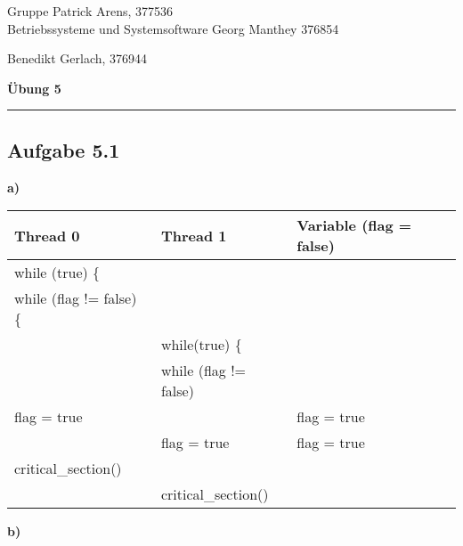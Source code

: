 \documentclass[a4paper,graphics,11pt]{article}
\newcommand{\aufgabe}[1]{\subsection*{Aufgabe #1}}
\begin{document}
\noindent Gruppe              \hfill Patrick Arens, 377536\\
\noindent Betriebssysteme und Systemsoftware    \hfill Georg Manthey 376854\\
\strut\hfill Benedikt Gerlach, 376944\\
\begin{center}
	\LARGE{\textbf{Übung 5}}
\end{center}
\begin{center}
\rule[0.1ex]{\textwidth}{1pt}
\end{center}

\aufgabe{5.1}

\textbf{a)}

{\tiny
\begin{tabular}{l | l | l}
Thread 0 		& Thread 1		&  Variable (flag = false)	\\
\toprule
while (true) \{  & 			&			\\
\midrule
while (flag != false) \{& 		&			\\
\midrule
& 			 while(true) \{	 & \\
\midrule
	&  	while (flag != false) 	& 			\\
\midrule
flag = true 	& 			&	flag = true	\\
\midrule
			& flag = true		&	flag = true	\\
\midrule
critical\_section() 			& 	& 			\\
\midrule 
& critical\_section() & \\
\bottomrule
\end{tabular}

\textbf{b)}

}
\end{document}
